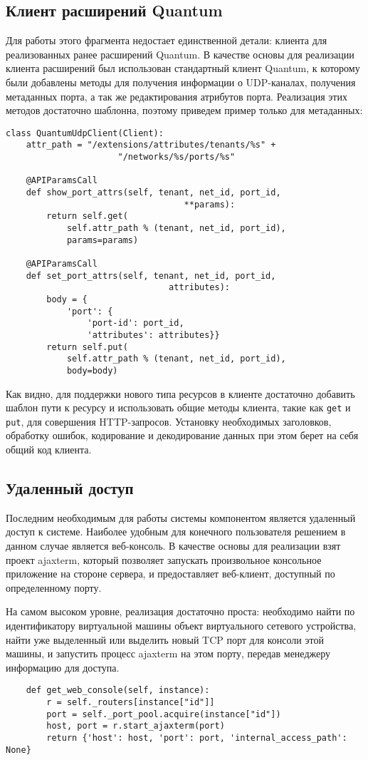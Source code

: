\subsection{Клиент расширений Quantum}
Для работы этого фрагмента недостает единственной детали: клиента для реализованных
ранее расширений Quantum. В качестве основы для реализации клиента расширений был использован 
стандартный клиент Quantum, к которому были добавлены методы для получения информации
о UDP-каналах, получения метаданных порта, а так же редактирования атрибутов порта.
Реализация этих методов достаточно шаблонна, поэтому приведем пример только для метаданных:
\begin{lstlisting}
class QuantumUdpClient(Client):
    attr_path = "/extensions/attributes/tenants/%s" + 
                      "/networks/%s/ports/%s"

    @APIParamsCall
    def show_port_attrs(self, tenant, net_id, port_id, 
                                   **params):
        return self.get(
            self.attr_path % (tenant, net_id, port_id),
            params=params)

    @APIParamsCall
    def set_port_attrs(self, tenant, net_id, port_id, 
                                attributes):
        body = {
            'port': {
                'port-id': port_id,
                'attributes': attributes}}
        return self.put(
            self.attr_path % (tenant, net_id, port_id), 
            body=body)
\end{lstlisting}
Как видно, для поддержки нового типа ресурсов в клиенте достаточно добавить шаблон
пути к ресурсу и использовать общие методы клиента, такие как \verb`get` и \verb`put`,
для совершения HTTP-запросов. Установку необходимых заголовков, обработку ошибок,
кодирование и декодирование данных при этом берет на себя общий код клиента.

\subsection{Удаленный доступ}

Последним необходимым для работы системы компонентом является удаленный доступ к 
системе. Наиболее удобным для конечного пользователя решением в данном случае является
веб-консоль. В качестве основы для реализации взят проект ajaxterm, который позволяет
запускать произвольное консольное приложение на стороне сервера, и предоставляет
веб-клиент, доступный по определенному порту.

На самом высоком уровне, реализация достаточно проста: необходимо найти по идентификатору
виртуальной машины объект виртуального сетевого устройства, найти уже выделенный или выделить
новый TCP порт для консоли этой машины, и запустить процесс ajaxterm на этом порту, передав
менеджеру информацию для доступа.
\begin{lstlisting}
    def get_web_console(self, instance):
        r = self._routers[instance["id"]]
        port = self._port_pool.acquire(instance["id"])
        host, port = r.start_ajaxterm(port)
        return {'host': host, 'port': port, 'internal_access_path': None}
\end{lstlisting}

